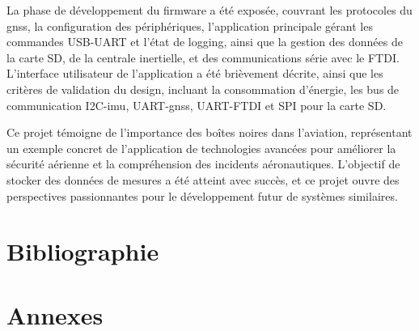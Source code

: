 \documentclass[12pt,a4paper,twoside]{article}
\begin{document}
La phase de développement du firmware a été exposée, couvrant les protocoles du \gls{gnss}, la configuration des périphériques, l'application principale gérant les commandes USB-UART et l'état de logging, ainsi que la gestion des données de la carte SD, de la centrale inertielle, et des communications série avec le \gls{FTDI}. L'interface utilisateur de l'application a été brièvement décrite, ainsi que les critères de validation du design, incluant la consommation d'énergie, les bus de communication I2C-\gls{imu}, UART-\gls{gnss}, UART-\gls{FTDI} et SPI pour la carte SD.

Ce projet témoigne de l'importance des boîtes noires dans l'aviation,  représentant un exemple concret de l'application de technologies avancées pour améliorer la sécurité aérienne et la compréhension des incidents aéronautiques. L'objectif de stocker des données de mesures a été atteint avec succès, et ce projet ouvre des perspectives passionnantes pour le développement futur de systèmes similaires.

\newpage
\nocite{*}
\section{Bibliographie}
 



\clearpage
\section{Annexes}
\end{document}
